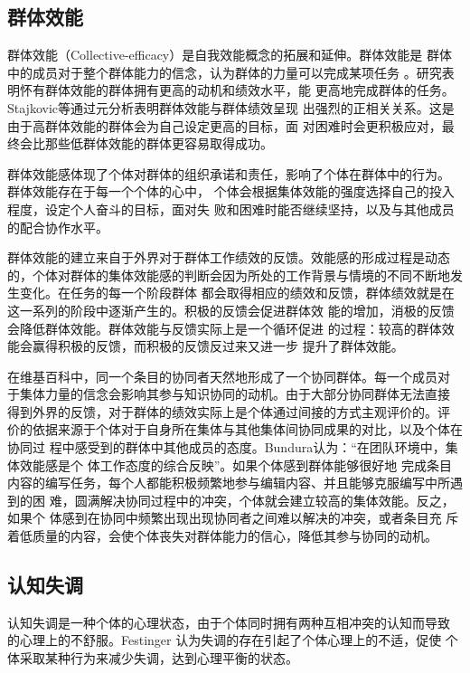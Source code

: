 \subsection{群体效能}
\label{sec:collective-efficacy}

群体效能（Collective-efficacy）是自我效能概念的拓展和延伸。群体效能是
群体中的成员对于整个群体能力的信念，认为群体的力量可以完成某项任务
\cite{bundura1977slt}。研究表明怀有群体效能的群体拥有更高的动机和绩效水平，能
更高地完成群体的任务。Stajkovic等通过元分析表明群体效能与群体绩效呈现
出强烈的正相关关系。这是由于高群体效能的群体会为自己设定更高的目标，面
对困难时会更积极应对，最终会比那些低群体效能的群体更容易取得成功\cite{stajkovic2009collective}。

群体效能感体现了个体对群体的组织承诺和责任，影响了个体在群体中的行为。
群体效能存在于每一个个体的心中，
个体会根据集体效能的强度选择自己的投入程度，设定个人奋斗的目标，面对失
败和困难时能否继续坚持，以及与其他成员的配合协作水平。

群体效能的建立来自于外界对于群体工作绩效的反馈。效能感的形成过程是动态
的，个体对群体的集体效能感的判断会因为所处的工作背景与情境的不同不断地发生变化。在任务的每一个阶段群体
都会取得相应的绩效和反馈，群体绩效就是在这一系列的阶段中逐渐产生的。积极的反馈会促进群体效
能的增加，消极的反馈会降低群体效能。群体效能与反馈实际上是一个循环促进
的过程：较高的群体效能会赢得积极的反馈，而积极的反馈反过来又进一步
提升了群体效能\cite{gist1987self}。

在维基百科中，同一个条目的协同者天然地形成了一个协同群体。每一个成员对
于集体力量的信念会影响其参与知识协同的动机。由于大部分协同群体无法直接
得到外界的反馈，对于群体的绩效实际上是个体通过间接的方式主观评价的。评
价的依据来源于个体对于自身所在集体与其他集体间协同成果的对比，以及个体在协同过
程中感受到的群体中其他成员的态度。Bundura认为：“在团队环境中，集体效能感是个
体工作态度的综合反映”\cite{bundura1977slt}。如果个体感到群体能够很好地
完成条目内容的编写任务，每个人都能积极频繁地参与编辑内容、并且能够克服编写中所遇到的困
难，圆满解决协同过程中的冲突，个体就会建立较高的集体效能。反之，如果个
体感到在协同中频繁出现出现协同者之间难以解决的冲突，或者条目充
斥着低质量的内容，会使个体丧失对群体能力的信心，降低其参与协同的动机。

\subsection{认知失调}
\label{sec:cognitive-dissonance}
认知失调是一种个体的心理状态，由于个体同时拥有两种互相冲突的认知而导致
的心理上的不舒服。Festinger 认为失调的存在引起了个体心理上的不适，促使
个体采取某种行为来减少失调，达到心理平衡的状态\cite{festinger1957theory}。

